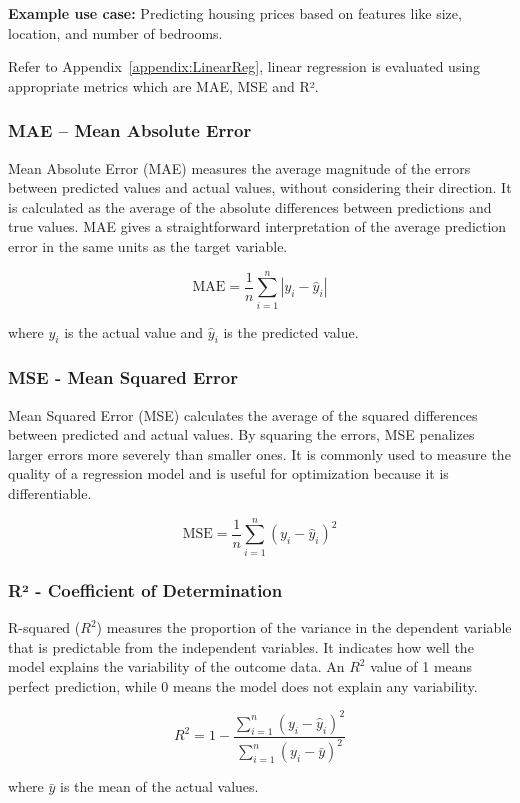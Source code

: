 \documentclass[12pt]{article}
\begin{document}
\textbf{Example use case:} Predicting housing prices based on features like size, location, and number of bedrooms.

Refer to Appendix~\ref{appendix:LinearReg}, linear regression is evaluated using appropriate metrics which are MAE, MSE and R².

\subsubsection{MAE – Mean Absolute Error}
Mean Absolute Error (MAE) measures the average magnitude of the errors between predicted values and actual values, without considering their direction. It is calculated as the average of the absolute differences between predictions and true values. MAE gives a straightforward interpretation of the average prediction error in the same units as the target variable.

\[
\text{MAE} = \frac{1}{n} \sum_{i=1}^n | y_i - \hat{y}_i |
\]

where $y_i$ is the actual value and $\hat{y}_i$ is the predicted value.

\subsubsection{MSE - Mean Squared Error}
Mean Squared Error (MSE) calculates the average of the squared differences between predicted and actual values. By squaring the errors, MSE penalizes larger errors more severely than smaller ones. It is commonly used to measure the quality of a regression model and is useful for optimization because it is differentiable.

\[
\text{MSE} = \frac{1}{n} \sum_{i=1}^n ( y_i - \hat{y}_i )^2
\]

\subsubsection{R² - Coefficient of Determination}
R-squared ($R^2$) measures the proportion of the variance in the dependent variable that is predictable from the independent variables. It indicates how well the model explains the variability of the outcome data. An $R^2$ value of 1 means perfect prediction, while 0 means the model does not explain any variability.

\[
R^2 = 1 - \frac{\sum_{i=1}^n (y_i - \hat{y}_i)^2}{\sum_{i=1}^n (y_i - \bar{y})^2}
\]

where $\bar{y}$ is the mean of the actual values.
\end{document}
